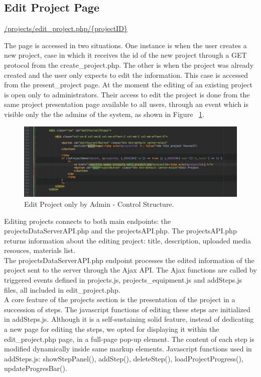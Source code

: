 \subsection{Edit Project Page}
\url{/projects/edit\_project.php/{projectID}}

The page is accessed in two situations. One instance is when the user creates a new project, case in which it receives the id of the new project through a GET protocol from the create\_project.php.
The other is when the project was already created and the user only expects to edit the information. This case is accessed from the present\_project page. At the moment the editing of an existing project is open only to administrators. Their access to edit the project is done from the same project presentation page available to all users, through an event which is visible only the the admins of the system, as shown in Figure ~\ref{fig:edit_project}.\\

\begin{figure}
\includegraphics[width=1\linewidth]{images/edit.png}
\caption{Edit Project only by Admin - Control Structure.}
\label{fig:edit_project}
\end{figure}	

Editing projects connects to both main endpoints: the projectsDataServerAPI.php and the projectsAPI.php. The projectsAPI.php returns information about the editing project: title, description, uploaded media resouces, materials list. \\	

The projectsDataServerAPI.php endpoint processes the edited information of the project sent to the server through the Ajax API. The Ajax functions are called by triggered events defined in projects.js, projects\_equipment.js and addSteps.js files, all included in edit\_project.php.\\

A core feature of the projects section is the presentation of the project in a succession of steps. The javascript functions of editing these steps are initialized in addSteps.js.
Although it is a self-sustaining solid feature, instead of dedicating a new page for editing the steps, we opted for displaying it within the edit\_project.php page, in a full-page pop-up element. The content of each step is modified dynamically inside same markup elements. Javascript functions used in addSteps.js: showStepPanel(), addStep(), deleteStep(), loadProjectProgress(), updateProgresBar().\\

